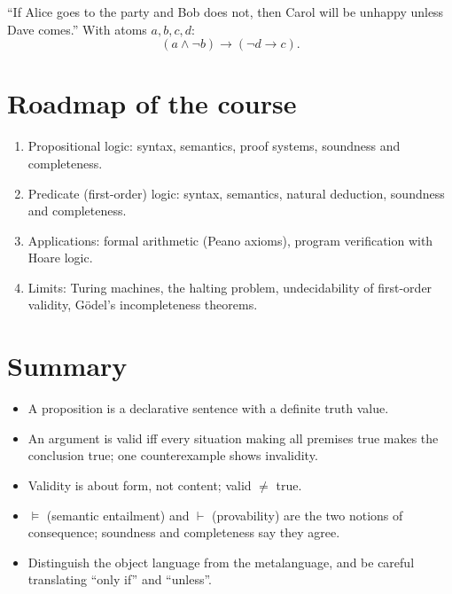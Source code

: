 \begin{example}
``If Alice goes to the party and Bob does not, then Carol will be unhappy unless Dave
comes.'' With atoms $a,b,c,d$:
\[
  (a \land \neg b) \to (\neg d \to c).
\]
\end{example}

\section{Roadmap of the course}

\begin{enumerate}
  \item Propositional logic: syntax, semantics, proof systems, soundness and completeness.
  \item Predicate (first-order) logic: syntax, semantics, natural deduction, soundness
        and completeness.
  \item Applications: formal arithmetic (Peano axioms), program verification with Hoare
        logic.
  \item Limits: Turing machines, the halting problem, undecidability of first-order
        validity, G\"odel's incompleteness theorems.
\end{enumerate}

\section*{Summary}
\begin{itemize}
  \item A proposition is a declarative sentence with a definite truth value.
  \item An argument is valid iff every situation making all premises true makes the
        conclusion true; one counterexample shows invalidity.
  \item Validity is about form, not content; valid $\neq$ true.
  \item $\models$ (semantic entailment) and $\vdash$ (provability) are the two notions of
        consequence; soundness and completeness say they agree.
  \item Distinguish the object language from the metalanguage, and be careful
        translating ``only if'' and ``unless''.
\end{itemize}
